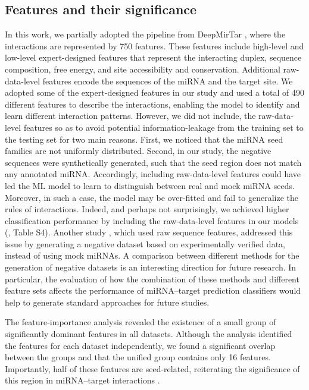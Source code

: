 \documentclass{bmcart}
\begin{document}
\subsection*{Features and their significance}
In this work, we partially adopted the pipeline from DeepMirTar \cite{wen2018deepmirtar}, where the interactions are represented by 750 features. These features include high-level and low-level expert-designed features that represent the interacting duplex, sequence composition, free energy, and site accessibility and conservation. Additional raw-data-level features encode the sequences of the miRNA and the target site. We adopted some of the expert-designed features in our study and used a total of 490 different features to describe the interactions, enabling the model to identify and learn different interaction patterns. 
However, we did not include, the raw-data-level features so as to avoid potential information-leakage from the training set to the testing set for two main reasons. First, we noticed that the miRNA seed families are not uniformly distributed. Second, in our study, the negative sequences were synthetically generated, such that the seed region does not match any annotated miRNA. Accordingly, including raw-data-level features could have led the ML model to learn to distinguish between real and mock miRNA seeds.  Moreover, in such a case, the model may be over-fitted and fail to generalize the rules of interactions. Indeed, and perhaps not surprisingly, we achieved higher classification performance by including the raw-data-level features in our models (, Table S4). Another study \cite{pla2018miraw}, which used raw sequence features, addressed this issue by generating a negative dataset based on experimentally verified data, instead of using mock miRNAs. A comparison between different methods for the generation of negative datasets is an interesting direction for future research. In particular, the evaluation of how the combination of these methods and different feature sets affects the performance of miRNA--target prediction classifiers would help to generate standard approaches for future studies.

The feature-importance analysis revealed the existence of a small group of significantly dominant features in all datasets. Although the analysis identified the features for each dataset independently, we found a significant overlap between the groups and that the unified group contains only 16 features. Importantly, half of these features are seed-related, reiterating the significance of this region in miRNA--target interactions \cite{agarwal2015predicting}.
\end{document}
